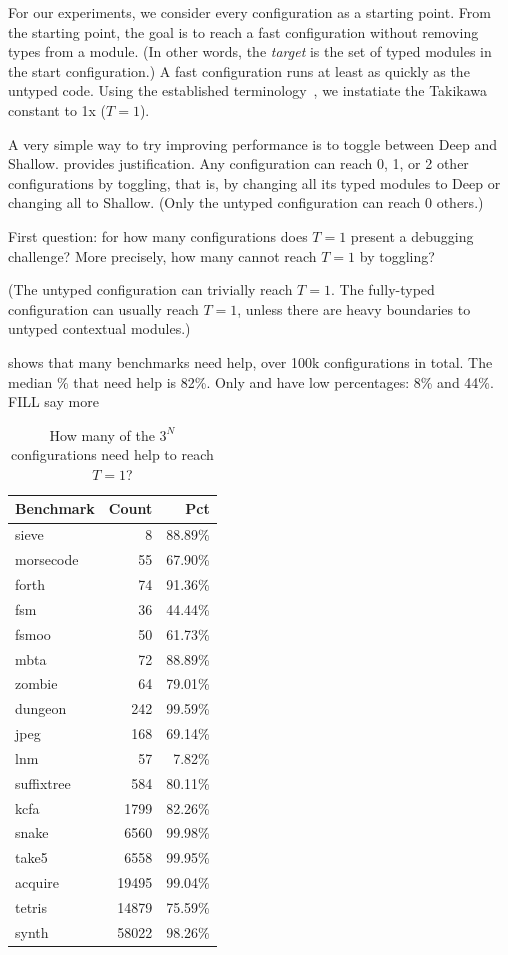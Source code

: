For our experiments, we consider every configuration as a starting point.
From the starting point, the goal is to reach a fast configuration without
removing types from a module.
(In other words, the \emph{target} is the set of typed modules in the start
configuration.)
A fast configuration runs at least as quickly as the untyped code.
Using the established terminology~\cite{vss-popl-2017,bbst-oopsla-2017},
we instatiate the Takikawa constant to 1x ($T=1$).

A very simple way to try improving performance is to toggle between
Deep and Shallow.
\citet{g-pldi-2022} provides justification.
Any configuration can reach 0, 1, or 2 other configurations by
toggling, that is, by changing all its typed modules to Deep or
changing all to Shallow.
(Only the untyped configuration can reach 0 others.)

First question: for how many configurations does $T=1$ present a debugging challenge?
More precisely, how many cannot reach $T=1$ by toggling?

(The untyped configuration can trivially reach $T=1$.
The fully-typed configuration can usually reach $T=1$, unless there are heavy
boundaries to untyped contextual modules.)

 shows that many benchmarks need help,
over 100k configurations in total.
The median \% that need help is 82\%.
Only  and  have low percentages: 8\% and 44\%.
FILL say more

\begin{table}[t]
  \caption{How many of the $3^N$ configurations need help to reach $T=1$?}
  \label{t:baseline-trouble}
  \begin{tabular}{lrr}
    Benchmark  & Count & Pct \\\midrule
    sieve      & 8     & 88.89\% \\
    morsecode  & 55    & 67.90\% \\
    forth      & 74    & 91.36\% \\
    fsm        & 36    & 44.44\% \\
    fsmoo      & 50    & 61.73\% \\
    mbta       & 72    & 88.89\% \\
    zombie     & 64    & 79.01\% \\
    dungeon    & 242   & 99.59\% \\
    jpeg       & 168   & 69.14\% \\
    lnm        & 57    &  7.82\% \\
    suffixtree & 584   & 80.11\% \\
    kcfa       & 1799  & 82.26\% \\
    snake      & 6560  & 99.98\% \\
    take5      & 6558  & 99.95\% \\
    acquire    & 19495 & 99.04\% \\
    tetris     & 14879 & 75.59\% \\
    synth      & 58022 & 98.26\% \\
  \end{tabular}

\end{table}


